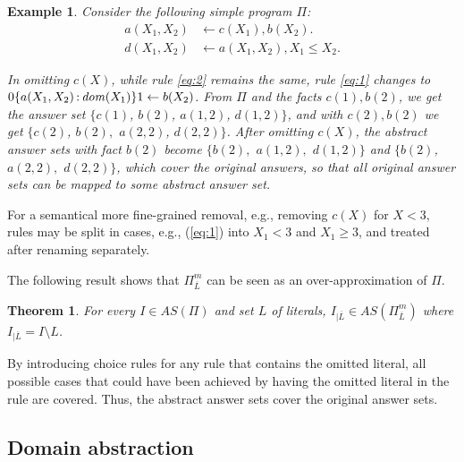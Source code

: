 \documentclass{new_tlp}
\newcommand{\nqbls}{\vspace*{-0.25\baselineskip}}
\newcommand{\nhbls}{\vspace*{-0.5\baselineskip}}
\def\mi#1{\mathit{#1\/}}
\def\beq{\begin{equation}}
\def\eeq#1{\label{#1}\end{equation}}
\newtheorem{thm}{Theorem}[section]
\newtheorem{exmp}{Example}
\begin{document}
\begin{exmp}\label{ex:toy}
Consider the following simple program $\Pi$:
\vspace*{-.25\baselineskip}
\begin{align}
  a(X_1,X_2) &\leftarrow c(X_1), b(X_2). \label{eq:1}\\
  d(X_1,X_2) &\leftarrow a(X_1,X_2), X_1{\leq}X_2.\label{eq:2}
\end{align} 
\vspace*{-1.25\baselineskip}

%
In omitting $c(X)$, while rule \eqref{eq:2} remains the same, rule \eqref{eq:1} changes to 
$0\{a(X_1,X_2)\,{:}\,\mi{dom}(X_1)\}1 \leftarrow b(X_2)$.
From %
$\Pi$
and the facts $c(1),b(2)$, we get the answer set $\{c(1)$, $b(2)$,
$a(1,2)$, $d(1,2)\}$, and with $c(2),b(2)$ we get
$\{c(2)$, $b(2),$ $a(2,2)$, $d(2,2)\}$.
 After omitting $c(X)$, the abstract answer
sets with fact $b(2)$ become $\{b(2),$ $a(1,2),$ $d(1,2)\}$ and
$\{b(2)$, $a(2,2),$ $d(2,2)\}$, which cover the original answers, so that all original answer sets can be mapped to
some abstract answer set.
\end{exmp}

For a semantical more fine-grained removal, e.g., removing $c(X)$ for $X{<}3$, rules may be split in cases, e.g., (\ref{eq:1}) into $X_1{<}3$ and $X_1{\geq} 3$, and
treated after renaming separately.

The following result shows that $\Pi_{\overline{L}}^m$ can be seen as an over-approximation of $\Pi$.%

\begin{thm}
For every $I \in AS(\Pi)$ and set $L$ of literals,
$I_{|\overline{L}} \in AS(\Pi_{\overline{L}}^m)$ where $I_{|\overline{L}} =I\setminus L$.
\end{thm}

\noindent By introducing choice rules for any rule that contains the omitted literal, all possible cases that could have been achieved by having the omitted literal in the rule are covered. Thus, the abstract answer sets cover the original answer sets.

\nqbls

\subsection{Domain abstraction} 
\end{document}

